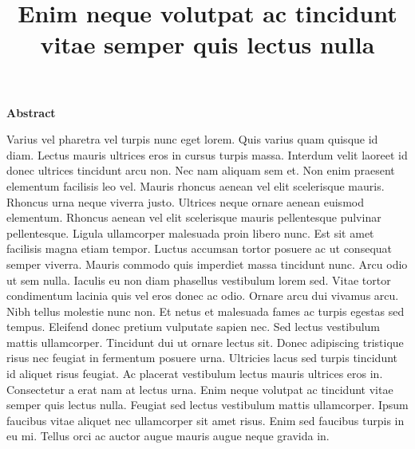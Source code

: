 \documentclass[12pt]{article}
\title{\Large{\textsf{\textbf{Enim neque volutpat ac tincidunt vitae semper quis lectus nulla}}}}
\begin{document}
\maketitle  %
	
\begin{adjustwidth}{20pt}{20pt}
\begin{spacing}{0.8}
	\small
	\begin{center}
		\vspace{10mm}
		\textsf{\textbf{Abstract}}
		\vspace{5mm}
	\end{center}
	
	\noindent Varius vel pharetra vel turpis nunc eget lorem. Quis varius quam quisque id diam. Lectus mauris ultrices eros in cursus turpis massa. Interdum velit laoreet id donec ultrices tincidunt arcu non. Nec nam aliquam sem et. Non enim praesent elementum facilisis leo vel. Mauris rhoncus aenean vel elit scelerisque mauris. Rhoncus urna neque viverra justo. Ultrices neque ornare aenean euismod elementum. Rhoncus aenean vel elit scelerisque mauris pellentesque pulvinar pellentesque. Ligula ullamcorper malesuada proin libero nunc. Est sit amet facilisis magna etiam tempor. Luctus accumsan tortor posuere ac ut consequat semper viverra. Mauris commodo quis imperdiet massa tincidunt nunc. Arcu odio ut sem nulla. Iaculis eu non diam phasellus vestibulum lorem sed. Vitae tortor condimentum lacinia quis vel eros donec ac odio. Ornare arcu dui vivamus arcu. Nibh tellus molestie nunc non. Et netus et malesuada fames ac turpis egestas sed tempus. Eleifend donec pretium vulputate sapien nec. Sed lectus vestibulum mattis ullamcorper. Tincidunt dui ut ornare lectus sit. Donec adipiscing tristique risus nec feugiat in fermentum posuere urna. Ultricies lacus sed turpis tincidunt id aliquet risus feugiat. Ac placerat vestibulum lectus mauris ultrices eros in. Consectetur a erat nam at lectus urna. Enim neque volutpat ac tincidunt vitae semper quis lectus nulla. Feugiat sed lectus vestibulum mattis ullamcorper. Ipsum faucibus vitae aliquet nec ullamcorper sit amet risus. Enim sed faucibus turpis in eu mi. Tellus orci ac auctor augue mauris augue neque gravida in. \\[2ex]
	

\end{spacing}
\end{adjustwidth}
\end{document}
